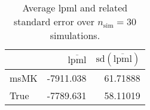 \begin{table}[H]

\caption{Average lpml and related standard error over $n_{\text{sim}} = 30$ simulations.}
\centering
\begin{tabular}[t]{lrr}
\toprule
  & $\overbar{\text{lpml}}$ & $\text{sd}(\overbar{\text{lpml}})$\\
\midrule
msMK & -7911.038 & 61.71888\\
True & -7789.631 & 58.11019\\
\bottomrule
\end{tabular}
\end{table}
